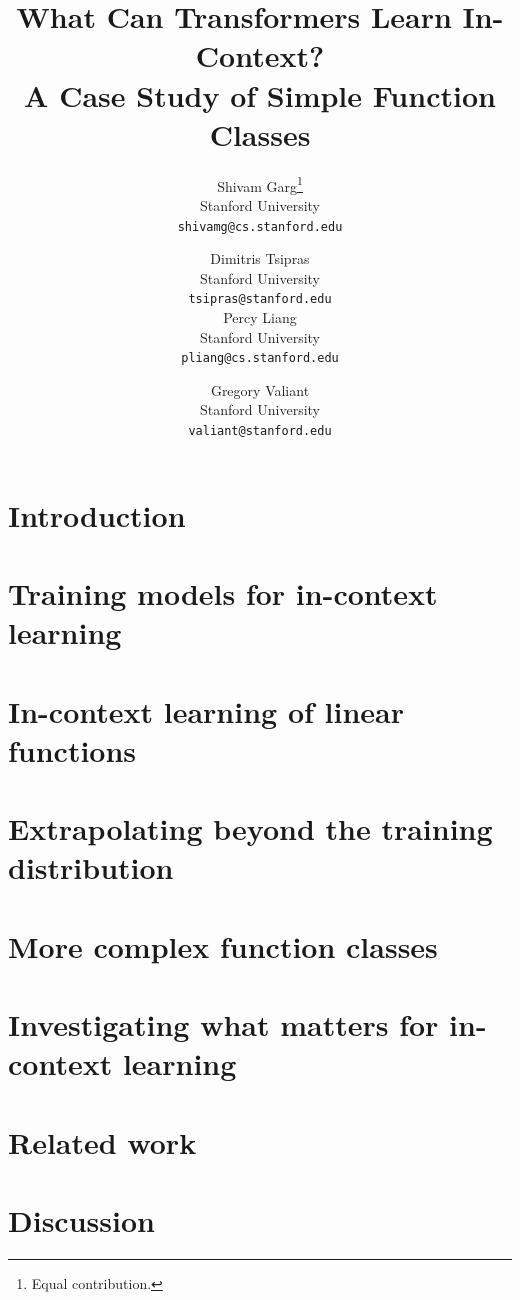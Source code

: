 \documentclass{article}
\title{What Can Transformers Learn In-Context? \\
A Case Study of Simple Function Classes}
\date{}
\author{
  Shivam Garg\thanks{Equal contribution.} \\
  Stanford University\\
  \texttt{shivamg@cs.stanford.edu} \\
  \and
  Dimitris Tsipras\footnotemark[1] \\
  Stanford University\\
  \texttt{tsipras@stanford.edu} \\ 
  \AND
  Percy Liang\\
  Stanford University\\
  \texttt{pliang@cs.stanford.edu} \\ 
  \and
  Gregory Valiant \\
  Stanford University\\
  \texttt{valiant@stanford.edu}
}
\begin{document}
\maketitle


\begin{abstract}
 
\end{abstract}

\section{Introduction}


\section{Training models for in-context learning}
\label{sec:setting}


\section{In-context learning of linear functions}
\label{sec:linear_functions}



\section{Extrapolating beyond the training distribution}
\label{sec:distribution_shifts}



\section{More complex function classes}
\label{sec:beyond_linear}


\section{Investigating what matters for in-context learning}
\label{sec:factors}


\section{Related work}
\label{sec:related}


\section{Discussion}
\label{sec:discussion}

\end{document}
